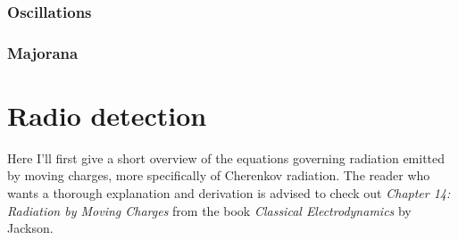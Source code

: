\documentclass[11pt,a4paper,faculty=we,language=en,doctype=report]{cls/ugent-doc}
\begin{document}
\subsection{Oscillations}
\subsection{Majorana}
\newpage
\chapter{Radio detection}
Here I'll first give a short overview of the equations governing radiation emitted by moving charges, more specifically of Cherenkov radiation. The reader who wants a thorough explanation and derivation is advised to check out \textit{Chapter 14: Radiation by Moving Charges} from the book \textit{Classical Electrodynamics} by Jackson. 
\end{document}
